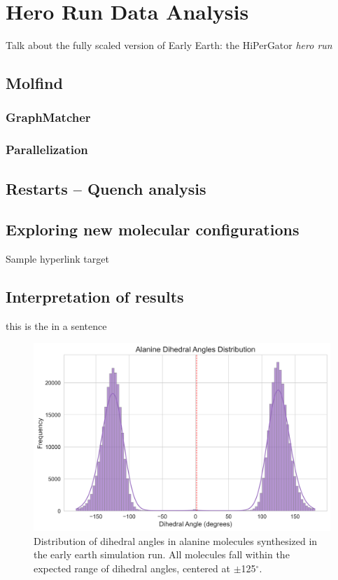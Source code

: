\chapter{Hero Run Data Analysis} 
\label{chapter5}

Talk about the fully scaled version of Early Earth: the HiPerGator \textit{hero run}

\section{Molfind}

\subsection{GraphMatcher}

\subsection{Parallelization}


\section{Restarts -- Quench analysis}


\section{Exploring new molecular configurations}
\hypertarget{configurational_sampling}{Sample hyperlink target}

\section{Interpretation of results}



this is the \angstrom in a sentence

\begin{figure}[!ht]
    \centering
    \includegraphics[width=1\linewidth]{Images/useful figures/alanine_dihedral/dihedral_angles_distribution.png}
    \caption{Distribution of dihedral angles in alanine molecules synthesized in the early earth simulation run. All molecules fall within the expected range of dihedral angles, centered at $\pm$125$^\circ$.}
    \label{ala_dihedral}
\end{figure}{}

